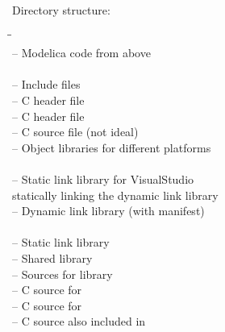 \begin{example}
Directory structure:
\ifpdf
\else
\par
\fi
{\upshape
\begin{tabbing}
\hspace{15em}\=\hspace{1em}\=\kill
{}\\
\quad{}                        \>-- \>Modelica code from above\\
\quad{}\\
\quad\quad{}                      \>-- \>Include files\\
\quad\quad\quad{}         \>-- \>C header file\\
\quad\quad\quad{}         \>-- \>C header file\\
\quad\quad\quad{}         \>-- \>C source file (not ideal)\\
\quad\quad{}                      \>-- \>Object libraries for different platforms\\
\quad\quad\quad{}\\
\quad\quad\quad\quad{}   \>-- \>Static link library for VisualStudio\\
\quad\quad\quad\quad{}   \>   \>statically linking the dynamic link library\\
\quad\quad\quad\quad{}   \>-- \>Dynamic link library (with manifest)\\
\quad\quad\quad{}\\
\quad\quad\quad\quad{}  \>-- \>Static link library\\
\quad\quad\quad\quad{} \>-- \>Shared library\\
\quad\quad{}                       \>-- \>Sources for library\\
\quad\quad\quad{}                 \>-- \>C source for \\
\quad\quad\quad{}                 \>-- \>C source for \\
\quad\quad\quad{}            \>-- \>C source also included in \\

\end{tabbing}}
\end{example}
